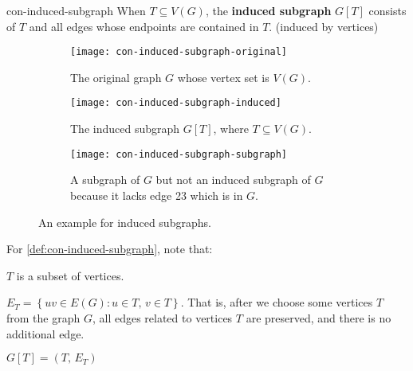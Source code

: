\documentclass[../src/handouts/main.tex]{subfiles}
\begin{document}
\begin{definition}{}{con-induced-subgraph}
  When $T \subseteq V(G)$, the \textbf{induced subgraph} $G[T]$ consists of $T$ and all edges whose endpoints are contained in $T$. (induced by vertices)
\end{definition}

\begin{figure}[htbp]
  \centering
  \begin{subfigure}[t]{.25\textwidth}
    \centering
    \texttt{[image: con-induced-subgraph-original]}
    \caption{The original graph $G$ whose vertex set is $V(G)$.}
    \label{fig:con-induced-subgraph-original}
  \end{subfigure}
  \hspace{.1\textwidth}
  \begin{subfigure}[t]{.25\textwidth}
    \centering
    \texttt{[image: con-induced-subgraph-induced]}
    \caption{The induced subgraph $G[T]$, where $T \subseteq V(G)$.}
    \label{fig:con-induced-subgraph-induced}
  \end{subfigure}
  \hspace{.1\textwidth}
  \begin{subfigure}[t]{.25\textwidth}
    \centering
    \texttt{[image: con-induced-subgraph-subgraph]}
    \caption{A subgraph of $G$ but not an induced subgraph of $G$ because it lacks edge 23 which is in $G$.}
    \label{fig:con-induced-subgraph-subgraph}
  \end{subfigure}
  \caption{An example for induced subgraphs.}
  \label{fig:con-induced-subgraph}
\end{figure}

For \cref{def:con-induced-subgraph}, note that:
\begin{enumerate*}
  \item $T$ is a subset of vertices.
  \item $E_T = \left\{ uv \in E(G): u \in T,\, v \in T \right\}$. That is, after we choose some vertices $T$ from the graph $G$, all edges related to vertices $T$ are preserved, and there is no additional edge.
  \item $G[T] = (T,\, E_T)$
\end{enumerate*}
\end{document}
